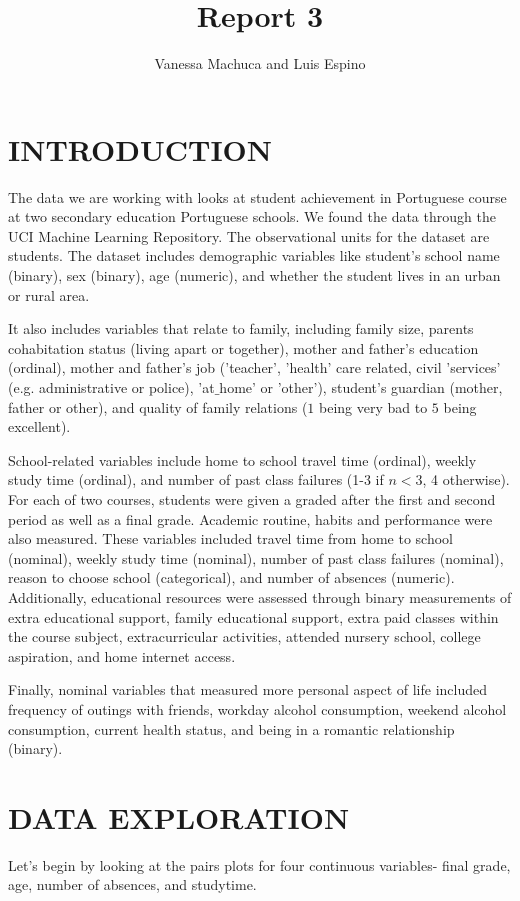 \documentclass{article}
\title{Report 3}
\author{Vanessa Machuca and Luis Espino}
\begin{document}

\maketitle

\section{INTRODUCTION}

The data we are working with looks at student achievement in Portuguese course at two secondary education Portuguese schools. We found the data through the UCI Machine Learning Repository. The observational units for the dataset are students. The dataset includes demographic variables like student’s school name (binary), sex (binary), age (numeric), and whether the student lives in an urban or rural area. 

It also includes variables that relate to family, including family size, parents cohabitation status (living apart or together), mother and father's education (ordinal), mother and father’s job ('teacher', 'health' care related, civil 'services' (e.g. administrative or police), 'at$\_$home' or 'other'), student’s guardian (mother, father or other), and quality of family relations ($1$ being very bad to $5$ being excellent). 

School-related variables include home to school travel time (ordinal), weekly study time (ordinal), and number of past class failures (1-3 if $n<3$, 4 otherwise). For each of two courses, students were given a graded after the first and second period as well as a final grade.  
Academic routine, habits and performance were also measured. These variables included travel time from home to school (nominal), weekly study time (nominal), number of past class failures (nominal), reason to choose school (categorical), and number of absences (numeric). Additionally, educational resources were assessed through binary measurements of extra educational support, family educational support, extra paid classes within the course subject, extracurricular activities, attended nursery school, college aspiration, and home internet access.

Finally, nominal variables that measured more personal aspect of life included frequency of outings with friends, workday alcohol consumption, weekend alcohol consumption, current health status, and being in a romantic relationship (binary). 



\section{DATA EXPLORATION}
Let's begin by looking at the pairs plots for four continuous variables- final grade, age, number of absences, and studytime. 
\end{document}
